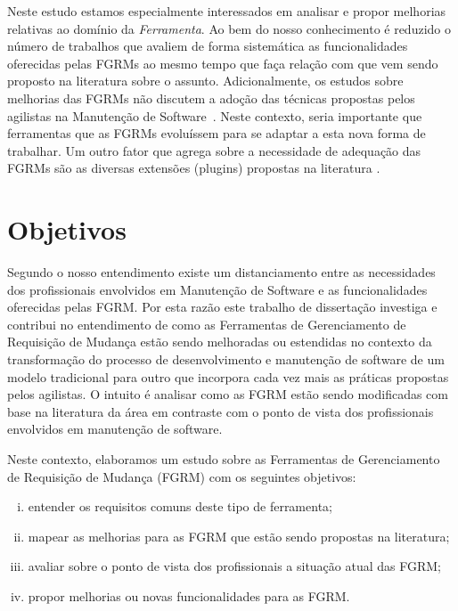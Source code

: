 Neste estudo estamos especialmente interessados em analisar e propor melhorias
relativas ao domínio da \textit{Ferramenta}. Ao bem do nosso conhecimento é
reduzido o número de trabalhos que avaliem de forma sistemática as
funcionalidades oferecidas pelas FGRMs ao mesmo tempo que faça relação com que
vem sendo proposto na li\-te\-ra\-tu\-ra sobre o assunto. Adicionalmente, os
estudos sobre melhorias das FGRMs não discutem a adoção das técnicas propostas
pelos agilistas na Manutenção de Software~\cite{Soltan2016,Devulapally2015,
    Heeager2015}. Neste contexto, seria importante que ferramentas que as FGRMs
evoluíssem para se adaptar a esta nova forma de trabalhar. Um outro fator que
agrega sobre a necessidade de adequação das FGRMs são as diversas extensões
(plugins) propostas na literatura
\cite{101186,Thung:2014:BIT:2635868.2661678,Kononenko:2014:DED:2591062.2591075}.

\section{Objetivos}
\label{sec:intro-objetivos}

Segundo o nosso entendimento existe um distanciamento entre as necessidades dos
profissionais envolvidos em Manutenção de Software e as funcionalidades
oferecidas pelas FGRM\@. Por esta razão este trabalho de dissertação investiga e
contribui no entendimento de como as Ferramentas de Gerenciamento de Requisição
de Mudança estão sendo melhoradas ou estendidas no contexto da transformação do
processo de desenvolvimento e manutenção de software de um modelo tradicional
para outro que incorpora cada vez mais as práticas propostas pelos agilistas. O
intuito é analisar como as FGRM estão sendo modificadas com base na literatura
da área em contraste com o ponto de vista dos profissionais envolvidos em
manutenção de software.

Neste contexto, elaboramos um estudo sobre as Ferramentas de Gerenciamento de
Requisição de Mudança (FGRM) com os seguintes objetivos:
\begin{enumerate}[(i)]
	\item entender os requisitos comuns deste tipo de ferramenta;
	\item mapear as melhorias para as FGRM que estão sendo propostas na
		literatura;
	\item avaliar sobre o ponto de vista dos profissionais a
		situação atual das FGRM\@;
	\item propor melhorias ou novas funcionalidades para as FGRM\@.
\end{enumerate}

